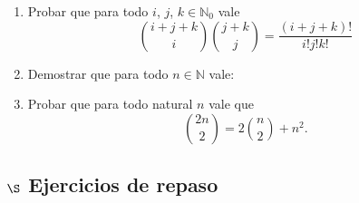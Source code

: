 \documentclass[a4paper,12pt,twoside,spanish,reqno]{amsbook}
\numberwithin{equation}{section}
\begin{document}
\begin {enumerate}
\item Probar que para todo $i$, $j$, $k \in {\mathbb N}_0$ vale
\begin{equation*}
    \binom{i + j + k}{i}\binom{j+k}{j} = \frac{(i+j+k)!}{i!j!k!}
\end{equation*}


\item Demostrar que para todo $n \in \mathbb N$ vale:


\item Probar que para todo natural $n$ vale que 
\begin{equation*}
    \binom{2n}{2} = 2 \binom{n}{2} + n^2.
\end{equation*}

\end{enumerate}



\subsection*{$\S$  Ejercicios de repaso}
\end{document}

